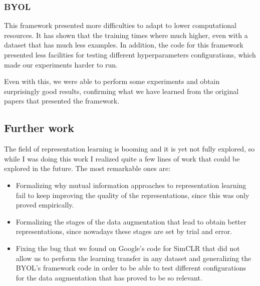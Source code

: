 \subsubsection*{BYOL}

This framework presented more difficulties to adapt to lower computational resources. It has shown that the training times where much higher, even with a dataset that has much less examples. In addition, the code for this framework presented less facilities for testing different hyperparameters configurations, which made our experiments harder to run.

Even with this, we were able to perform some experiments and obtain surprisingly good results, confirming what we have learned from the original papers that presented the framework.

\subsection*{Further work}

The field of representation learning is booming and it is yet not fully explored, so while I was doing this work I realized  quite a few lines of work that could be explored in the future. The most remarkable ones are:

\begin{itemize}

    \item Formalizing why mutual information approaches to representation learning fail to keep improving the quality of the representations, since this was only proved empirically.
    \item Formalizing the stages of the data augmentation that lead to obtain better representations, since nowadays these stages are set by trial and error. 
    \item Fixing the bug that we found on Google's code for SimCLR that did not allow us to perform the learning transfer in any dataset and generalizing the BYOL's framework code in order to be able to test different configurations for the data augmentation that has proved to be so relevant.

\end{itemize}

